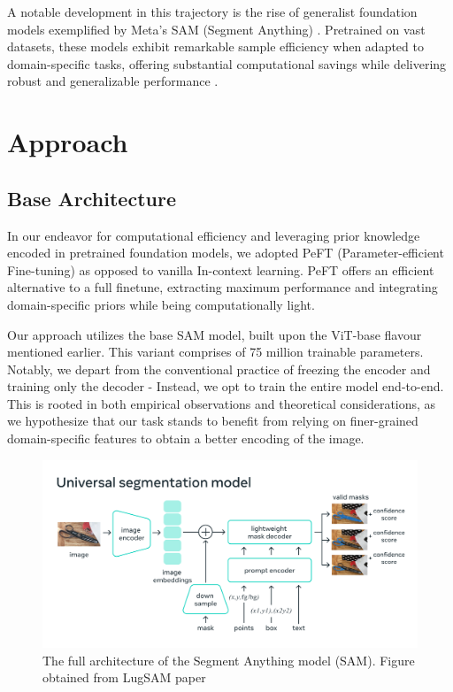 \documentclass[conference]{IEEEtran}
\begin{document}
A notable development in this trajectory is the rise of generalist foundation models exemplified by Meta's SAM (Segment Anything) \cite{b14}. Pretrained on vast datasets, these models exhibit remarkable sample efficiency when adapted to domain-specific tasks, offering substantial computational savings while delivering robust and generalizable performance \cite{b15}.

\section{Approach}
\subsection{Base Architecture}
In our endeavor for computational efficiency and leveraging prior knowledge encoded in pretrained foundation models, we adopted PeFT (Parameter-efficient Fine-tuning) \cite{b16} as opposed to vanilla In-context learning. PeFT offers an efficient alternative to a full finetune, extracting maximum performance and integrating domain-specific priors while being computationally light.

Our approach utilizes the base SAM model, built upon the ViT-base flavour mentioned earlier. This variant comprises of 75 million trainable parameters. Notably, we depart from the conventional practice of freezing the encoder and training only the decoder - Instead, we opt to train the entire model end-to-end. This is rooted in both empirical observations and theoretical considerations, as we hypothesize that our task stands to benefit from relying on finer-grained domain-specific features to obtain a better encoding of the image.

\begin{figure}
    \centering
    \includegraphics[width=1\linewidth]{sam_paper_dig_2.png}
    \caption{The full architecture of the Segment Anything model (SAM). Figure obtained from LugSAM paper\cite{b17}}
\end{figure}
\end{document}
